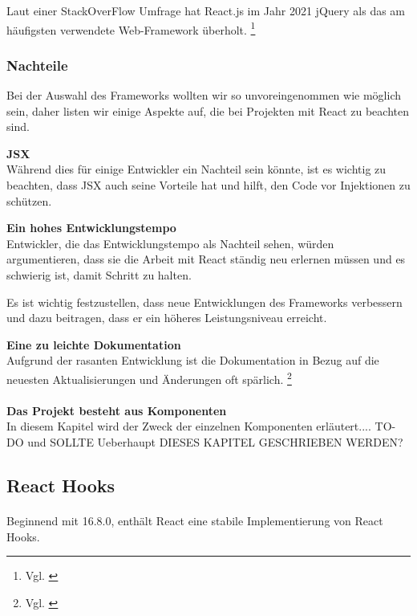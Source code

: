 Laut einer StackOverFlow Umfrage hat React.js im Jahr 2021 jQuery als das am häufigsten verwendete Web-Framework überholt.
\footnote{ Vgl. \cite{SO01}}
\newline

\subsubsection{Nachteile}
Bei der Auswahl des Frameworks wollten wir so unvoreingenommen wie möglich sein, daher listen wir einige Aspekte auf, die bei Projekten mit React zu beachten sind.
\newline

\textbf{JSX}\\
Während dies für einige Entwickler ein Nachteil sein könnte, ist es wichtig zu beachten, dass JSX auch seine Vorteile hat und hilft, den Code vor Injektionen zu schützen.
\newline

\textbf{Ein hohes Entwicklungstempo}\\
Entwickler, die das Entwicklungstempo als Nachteil sehen, würden argumentieren, dass sie die Arbeit mit React ständig neu erlernen müssen und es schwierig ist, damit Schritt zu halten.

Es ist wichtig festzustellen, dass neue Entwicklungen des Frameworks verbessern und dazu beitragen, dass er ein höheres Leistungsniveau erreicht. 
\newline

\textbf{Eine zu leichte Dokumentation}\\
Aufgrund der rasanten Entwicklung ist die Dokumentation in Bezug auf die neuesten Aktualisierungen und Änderungen oft spärlich. 
\footnote{ Vgl. \cite{R01}}

\paragraph{}
\textbf{Das Projekt besteht aus Komponenten}\\
In diesem Kapitel wird der Zweck der einzelnen Komponenten erläutert....
TO-DO und SOLLTE Ueberhaupt DIESES KAPITEL GESCHRIEBEN WERDEN?

\subsection{React Hooks}
\paragraph{}
Beginnend mit 16.8.0, enthält React eine stabile Implementierung von React Hooks.

